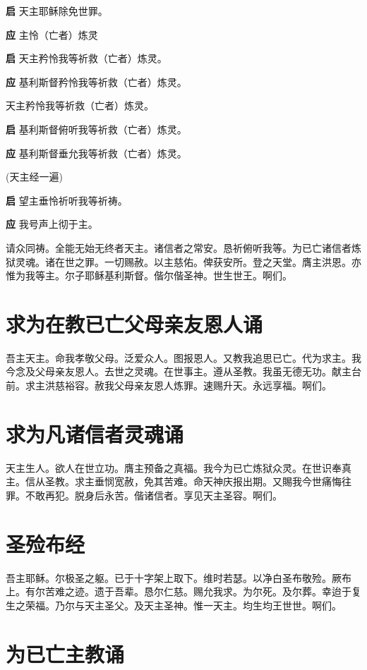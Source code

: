 \documentclass[UTF8,17pt]{ctexart}
\begin{document}
\textbf{启} \quad 天主耶稣除免世罪。

\textbf{应} \quad 主怜（亡者）炼灵

\textbf{启} \quad 天主矜怜我等祈救（亡者）炼灵。

\textbf{应} \quad 基利斯督矜怜我等祈救（亡者）炼灵。

 天主矜怜我等祈救（亡者）炼灵。

\textbf{启} \quad 基利斯督俯听我等祈救（亡者）炼灵。

\textbf{应} \quad 基利斯督垂允我等祈救（亡者）炼灵。

 (天主经⼀遍)

\textbf{启} \quad 望主垂怜祈听我等祈祷。

\textbf{应} \quad 我号声上彻于主。

请众同祷。全能⽆始⽆终者天主。诸信者之常安。恳祈俯听我等。为已亡诸信者炼狱灵魂。诸在世之罪。⼀切赐赦。以主慈佑。俾获安所。登之天堂。膺主洪恩。亦惟为我等主。尔⼦耶稣基利斯督。偕尔偕圣神。世⽣世王。啊们。

\section{求为在教已亡⽗母亲友恩⼈诵}

吾主天主。命我孝敬⽗母。泛爱众⼈。图报恩⼈。又教我追思已亡。代为求主。我今念及⽗母亲友恩⼈。去世之灵魂。在世事主。遵从圣教。我虽⽆德⽆功。献主台前。求主洪慈裕容。赦我⽗母亲友恩⼈炼罪。速赐升天。永远享福。啊们。

\section{求为凡诸信者灵魂诵}

天主⽣⼈。欲⼈在世⽴功。膺主预备之真福。我今为已亡炼狱众灵。在世识奉真主。信从圣教。求主垂悯宽赦，免其苦难。命天神庆报出期。又賜我今世痛悔往罪。不敢再犯。脱⾝后永苦。偕诸信者。享见天主圣容。啊们。

\section{圣殓布经}

吾主耶稣。尔极圣之躯。已于⼗字架上取下。维时若瑟。以净⽩圣布敬殓。厥布上。有尔苦难之迹。遗于吾辈。恳尔仁慈。赐允我求。为尔死。及尔葬。幸迨于复⽣之荣福。乃尔与天主圣⽗。及天主圣神。惟⼀天主。均⽣均王世世。啊们。

\section{为已亡主教诵}
\end{document}
